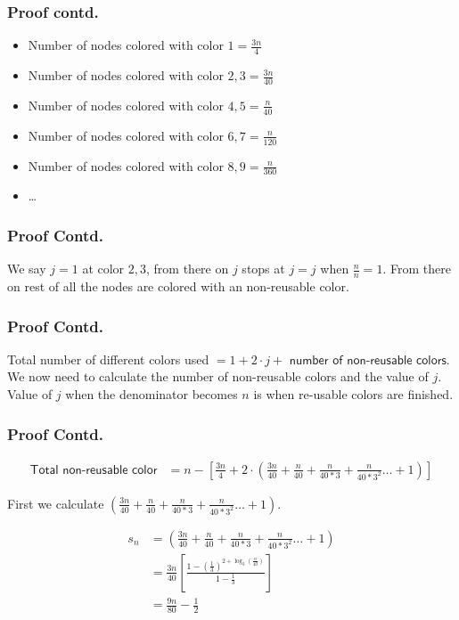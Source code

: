 \begin{frame}
    \frametitle{Proof contd.}

    \begin{itemize}
        \item Number of nodes colored with color $1 = \frac{3n}{4}$
        \item Number of nodes colored with color $2, 3 = \frac{3n}{40}$
        \item Number of nodes colored with color $4, 5 = \frac{n}{40}$
        \item Number of nodes colored with color $6, 7 = \frac{n}{120}$
        \item Number of nodes colored with color $8, 9 = \frac{n}{360}$
        \item \dots
    \end{itemize}    

\end{frame}

\begin{frame}
    \frametitle{Proof Contd.}

    We say $j = 1$ at color $2, 3$, from there on $j$ stops at $j = j$ when $\frac{n}{n} = 1$. From there on rest of all the nodes are colored with an non-reusable color.

\end{frame}

\begin{frame}
    \frametitle{Proof Contd.}

    Total number of different colors used $= 1 + 2\cdot j + \textsf{ number of non-reusable colors}$. We now need to calculate the number of non-reusable colors and the value of $j$. Value of $j$ when the denominator becomes $n$ is when re-usable colors are finished.    

\end{frame}

\begin{frame}
    \frametitle{Proof Contd.}

    \begin{align}
        \textsf{Total non-reusable color} &= n - \left[ \frac{3n}{4} + 2 \cdot \left( \frac{3n}{40} + \frac{n}{40} + \frac{n}{40 * 3} + \frac{n}{40 * 3^2} \dots + 1 \right)\right]
    \end{align}

    First we calculate $\left( \frac{3n}{40} + \frac{n}{40} + \frac{n}{40 * 3} + \frac{n}{40 * 3^2} \dots + 1 \right)$.

    \begin{align*}
        s_n &= \left( \frac{3n}{40} + \frac{n}{40} + \frac{n}{40 * 3} + \frac{n}{40 * 3^2} \dots + 1 \right)\\
        &= \frac{3n}{40} \left[ \frac{1 - \left(\frac{1}{3}\right)^{2 + \log_3\left(\frac{n}{40}\right)}}{1 - \frac{1}{3}} \right]\\
        &= \frac{9n}{80} - \frac{1}{2}
    \end{align*}    

\end{frame}

